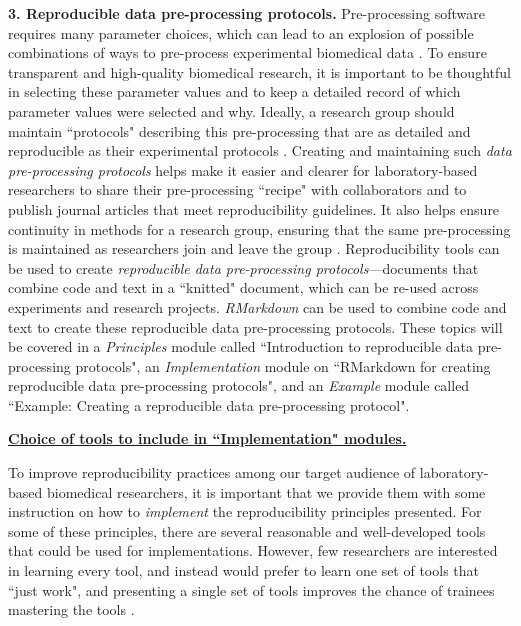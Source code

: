 \documentclass[pdftex,english,11pt,parskip=half]{scrartcl}
\begin{document}
\textbf{3. Reproducible data pre-processing protocols.} Pre-processing software requires many parameter choices, which can lead to an explosion of possible combinations of ways to pre-process experimental biomedical data \cite{munafo2017manifesto, shade2015computing, pernet2015improving}. To ensure transparent and high-quality biomedical research, it is important to be thoughtful in selecting these parameter values and to keep a detailed record of which parameter values were selected and why. Ideally, a research group should maintain ``protocols" describing this pre-processing that are as detailed and reproducible as their experimental protocols  \cite{gentleman2004bioconductor}. Creating and maintaining such \textit{data pre-processing protocols} helps make it easier and clearer for laboratory-based researchers to share their pre-processing ``recipe" with collaborators and to publish journal articles that meet reproducibility guidelines. It also helps ensure continuity in methods for a research group, ensuring that the same pre-processing is maintained as researchers join and leave the group \cite{shade2015computing}.
Reproducibility tools can be used to create \textit{reproducible data pre-processing protocols}---documents that combine code and text in a ``knitted" document, which can be re-used across experiments and research projects. \textit{RMarkdown} can be used to combine code and text to create these reproducible data pre-processing protocols. These topics will be covered in a \textit{Principles} module called ``Introduction to reproducible data pre-processing protocols", an \textit{Implementation} module on ``RMarkdown
for creating reproducible data pre-processing protocols", and an
\textit{Example} module called ``Example: Creating a reproducible data
pre-processing protocol". 

\underline{\textbf{Choice of tools to include in ``Implementation" modules.}}

To improve reproducibility practices among our target audience of laboratory-based biomedical researchers, it is important
that we provide them with some instruction on how to \textit{implement} the
reproducibility principles presented. For some of these principles, there are
several reasonable and well-developed tools that could be used for
implementations. However, few researchers are interested in learning every tool,
and instead would prefer to learn one set of tools that ``just work", and presenting a single set of tools improves the chance of trainees mastering the tools \cite{brown2018ten}. 
\end{document}
